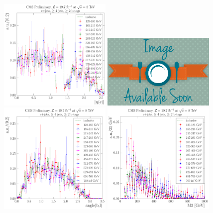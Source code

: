 \begin{figure}[hbtp]
    \centering
     \includegraphics[width=0.48\textwidth]{Chapters/04_Analysis/04b_XSections/images/8TeV/fit_variables/HT/electron_absolute_eta/vjets/HT_electron_absolute_eta_2orMoreBtags_VJets_template_comparison.pdf}\hfill
     \includegraphics[width=0.48\textwidth]{Chapters/04_Analysis/04b_XSections/images/placeholder.png}\\
     \includegraphics[width=0.48\textwidth]{Chapters/04_Analysis/04b_XSections/images/8TeV/fit_variables/HT/angle_bl/vjets/HT_angle_bl_2orMoreBtags_VJets_template_comparison.pdf}\hfill
     \includegraphics[width=0.48\textwidth]{Chapters/04_Analysis/04b_XSections/images/8TeV/fit_variables/HT/M3/vjets/HT_M3_2orMoreBtags_VJets_template_comparison.pdf}\\

\end{figure}

